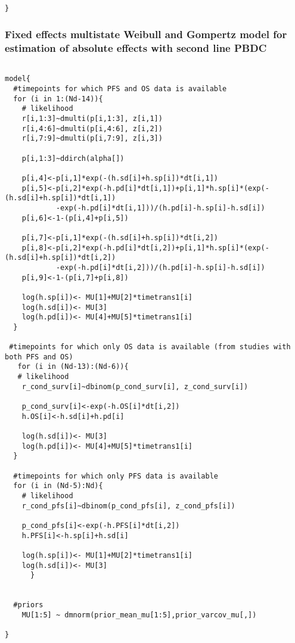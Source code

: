 \documentclass[11pt,final,fleqn]{article}\usepackage[]{graphicx}\usepackage[]{color}
\theoremstyle{plain}
\begin{document}
\begin{appendices}
\begin{verbatim}
}

\end{verbatim}

\subsubsection{Fixed effects multistate Weibull and Gompertz model for estimation of absolute effects with second line PBDC} 
\begin{verbatim} 

model{
  #timepoints for which PFS and OS data is available
  for (i in 1:(Nd-14)){
    # likelihood
    r[i,1:3]~dmulti(p[i,1:3], z[i,1]) 
    r[i,4:6]~dmulti(p[i,4:6], z[i,2]) 
    r[i,7:9]~dmulti(p[i,7:9], z[i,3]) 
    
    p[i,1:3]~ddirch(alpha[])
    
    p[i,4]<-p[i,1]*exp(-(h.sd[i]+h.sp[i])*dt[i,1])
    p[i,5]<-p[i,2]*exp(-h.pd[i]*dt[i,1])+p[i,1]*h.sp[i]*(exp(-(h.sd[i]+h.sp[i])*dt[i,1])
    		-exp(-h.pd[i]*dt[i,1]))/(h.pd[i]-h.sp[i]-h.sd[i])
    p[i,6]<-1-(p[i,4]+p[i,5])
    
    p[i,7]<-p[i,1]*exp(-(h.sd[i]+h.sp[i])*dt[i,2])
    p[i,8]<-p[i,2]*exp(-h.pd[i]*dt[i,2])+p[i,1]*h.sp[i]*(exp(-(h.sd[i]+h.sp[i])*dt[i,2])
    		-exp(-h.pd[i]*dt[i,2]))/(h.pd[i]-h.sp[i]-h.sd[i])
    p[i,9]<-1-(p[i,7]+p[i,8])
    
    log(h.sp[i])<- MU[1]+MU[2]*timetrans1[i] 
    log(h.sd[i])<- MU[3]
    log(h.pd[i])<- MU[4]+MU[5]*timetrans1[i]
  }
  
 #timepoints for which only OS data is available (from studies with both PFS and OS)
   for (i in (Nd-13):(Nd-6)){
   # likelihood
    r_cond_surv[i]~dbinom(p_cond_surv[i], z_cond_surv[i]) 
    
    p_cond_surv[i]<-exp(-h.OS[i]*dt[i,2])
    h.OS[i]<-h.sd[i]+h.pd[i]
    
    log(h.sd[i])<- MU[3] 
    log(h.pd[i])<- MU[4]+MU[5]*timetrans1[i]
  }
    
  #timepoints for which only PFS data is available 
  for (i in (Nd-5):Nd){
    # likelihood
    r_cond_pfs[i]~dbinom(p_cond_pfs[i], z_cond_pfs[i]) 
    
    p_cond_pfs[i]<-exp(-h.PFS[i]*dt[i,2])
    h.PFS[i]<-h.sp[i]+h.sd[i]
    
    log(h.sp[i])<- MU[1]+MU[2]*timetrans1[i]
    log(h.sd[i])<- MU[3] 
      }
  
  
  #priors
    MU[1:5] ~ dmnorm(prior_mean_mu[1:5],prior_varcov_mu[,]) 

}


\end{verbatim}
\end{appendices}
\end{document}
